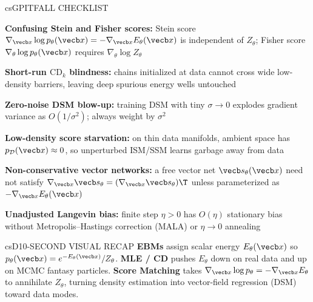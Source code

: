\documentclass[../../../../master.tex]{subfiles}
\begin{document}
\begin{cscolumns}
\begin{cscard}{csG}{PITFALL CHECKLIST}
  \begin{csbul}
    \item \textbf{Confusing Stein and Fisher scores:} Stein score $\nabla_{\vecb x}\log p_\theta(\vecb x)=-\nabla_{\vecb x}E_\theta(\vecb x)$ is independent of $Z_\theta$; Fisher score $\nabla_\theta\log p_\theta(\vecb x)$ requires $\nabla_\theta\log Z_\theta$
    \item \textbf{Short-run $\mathrm{CD}_k$ blindness:} chains initialized at data cannot cross wide low-density barriers, leaving deep spurious energy wells untouched
    \item \textbf{Zero-noise DSM blow-up:} training DSM with tiny $\sigma\to 0$ explodes gradient variance as $O(1/\sigma^2)$; always weight by $\sigma^2$
    \item \textbf{Low-density score starvation:} on thin data manifolds, ambient space has $p_{\mathcal D}(\vecb x)\approx 0$, so unperturbed ISM/SSM learns garbage away from data
    \item \textbf{Non-conservative vector networks:} a free vector net $\vecb s_\theta(\vecb x)$ need not satisfy $\nabla_{\vecb x}\vecb s_\theta=(\nabla_{\vecb x}\vecb s_\theta)\T$ unless parameterized as $-\nabla_{\vecb x}E_\theta(\vecb x)$
    \item \textbf{Unadjusted Langevin bias:} finite step $\eta>0$ has $O(\eta)$ stationary bias without Metropolis--Hastings correction (MALA) or $\eta\to 0$ annealing
  \end{csbul}
\end{cscard}

\begin{cscard}{csD}{10-SECOND VISUAL RECAP}
  \sffamily\footnotesize
  \textbf{EBMs} assign scalar energy $E_\theta(\vecb x)$ so $p_\theta(\vecb x)=e^{-E_\theta(\vecb x)}/Z_\theta$.
  \textbf{MLE / CD} pushes $E_\theta$ down on real data and up on MCMC fantasy particles.
  \textbf{Score Matching} takes $\nabla_{\vecb x}\log p_\theta=-\nabla_{\vecb x}E_\theta$ to annihilate $Z_\theta$, turning density estimation into vector-field regression (DSM) toward data modes.
\end{cscard}
\end{cscolumns}

\csend
\end{document}
